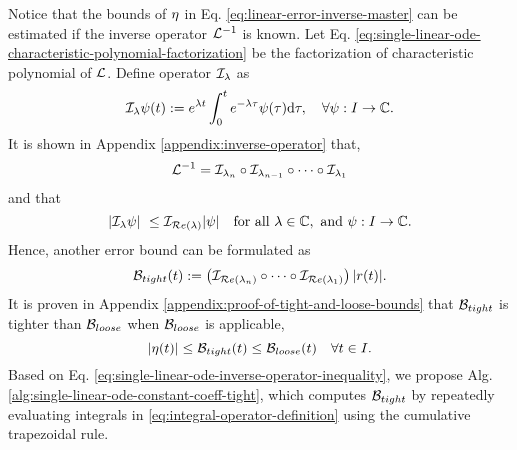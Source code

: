     Notice that the bounds of $\eta$ in Eq. \eqref{eq:linear-error-inverse-master} can be estimated if the inverse operator $\mathcal{L}^{-1}$ is known. 
    Let Eq. \eqref{eq:single-linear-ode-characteristic-polynomial-factorization} be the factorization of characteristic polynomial of $\mathcal{L}$.
    Define operator $\mathcal{I}_{\lambda}$ as
    \begin{equation} \label{eq:integral-operator-definition}
        \mathcal{I}_\lambda \psi(t) := e^{{\lambda} t} \int_{0}^{t} e^{-{\lambda} \tau} \psi(\tau) \mathrm{d}\tau, \quad \forall \psi : I \to \mathbb{C}.
    \end{equation}
    It is shown in Appendix \ref{appendix:inverse-operator} that,
    \begin{equation} \label{eq:single-linear-ode-inverse-operator-factorization}
        \mathcal{L}^{-1} = \mathcal{I}_{\lambda_{n}} \circ \mathcal{I}_{\lambda_{n-1}} \circ \dots \circ \mathcal{I}_{\lambda_1}
    \end{equation} 
    and that 
    \begin{equation} \label{eq:inverse-operator-inequality}
        \left|\mathcal{I}_{\lambda} \psi\right| \ \leq \mathcal{I}_{\mathcal{R}e\left(\lambda\right)} |\psi| \quad \text{for all }\lambda \in \mathbb{C}, \text{ and } \psi : I \to \mathbb{C}.
    \end{equation} 
    Hence, another error bound can be formulated as
    \begin{equation} \label{eq:single-linear-ode-inverse-operator-inequality}
        \mathcal{B}_{tight}(t) := \left(\mathcal{I}_{\mathcal{R}e\left(\lambda_{n}\right)} \circ \dots \circ \mathcal{I}_{\mathcal{R}e\left(\lambda_1\right)}\right) |r(t)|.
    \end{equation}
    It is proven in Appendix \ref{appendix:proof-of-tight-and-loose-bounds} that $\mathcal{B}_{tight}$ is tighter than $\mathcal{B}_{loose}$ when $\mathcal{B}_{loose}$ is applicable,
    \begin{equation} \label{eq:single-linear-ode-tight-and-loose}
        \left|\eta(t)\right| \leq \mathcal{B}_{tight}(t) \leq \mathcal{B}_{loose}(t) \quad \forall t \in I.
    \end{equation}
    Based on Eq. \eqref{eq:single-linear-ode-inverse-operator-inequality}, we propose Alg. \ref{alg:single-linear-ode-constant-coeff-tight}, which computes $\mathcal{B}_{tight}$ by repeatedly evaluating integrals in \eqref{eq:integral-operator-definition} using the cumulative trapezoidal rule.

